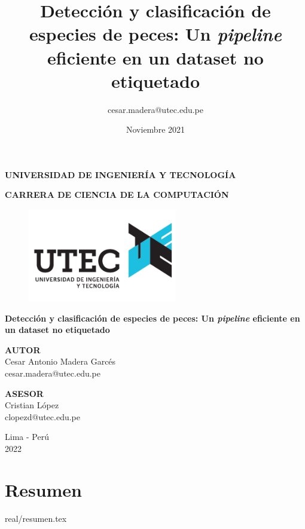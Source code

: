 \documentclass{report}
\title{Detección y clasificación de especies de peces: Un \textit{pipeline} eficiente en un dataset no etiquetado}
\author{cesar.madera@utec.edu.pe}
\date{Noviembre 2021}
\begin{document}
\begin{titlepage}
    \begin{center}
        \Large
        \textbf{UNIVERSIDAD DE INGENIERÍA Y TECNOLOGÍA}
        \vspace*{1cm}

        \large
        \textbf{CARRERA DE CIENCIA DE LA COMPUTACIÓN}
        \vspace*{1cm}

        \begin{figure}[htbp]
            \centering
            \includegraphics[width=6.5cm,height=\textheight,keepaspectratio]{images/logo}
        \end{figure}


        \LARGE
        \textbf{Detección y clasificación de especies de peces: Un \textit{pipeline} eficiente en un dataset no etiquetado}

        \vspace{1.0cm}
        \Large


        \textbf{AUTOR}
        \vspace{0.5cm}
        \\Cesar Antonio Madera Garcés
        \\cesar.madera@utec.edu.pe

        \textbf{ASESOR}
        \vspace{0.5cm}
        \\Cristian López
        \\clopezd@utec.edu.pe
        \vfill
        \Large

        Lima - Perú
        \\
        2022

    \end{center}
\end{titlepage}


\chapter*{Resumen}
{real/resumen.tex}
\end{document}
